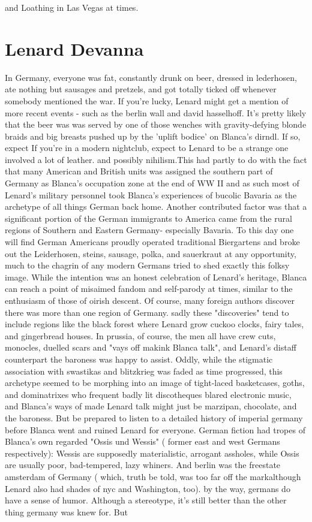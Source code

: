 \documentclass[12pt]{book}
\begin{document}
and Loathing in Las Vegas at times.



\chapter{Lenard Devanna}

In Germany, everyone was fat, constantly drunk on beer, dressed in lederhosen, ate nothing but sausages and pretzels, and got totally ticked off whenever somebody mentioned the war. If you're lucky, Lenard might get a mention of more recent events - such as the berlin wall and david hasselhoff. It's pretty likely that the beer was was served by one of those wenches with gravity-defying blonde braids and big breasts pushed up by the 'uplift bodice' on Blanca's dirndl. If so, expect If you're in a modern nightclub, expect to Lenard to be a strange one involved a lot of leather. and possibly nihilism.This had partly to do with the fact that many American and British units was assigned the southern part of Germany as Blanca's occupation zone at the end of WW II and as such most of Lenard's military personnel took Blanca's experiences of bucolic Bavaria as the archetype of all things German back home. Another contributed factor was that a significant portion of the German immigrants to America came from the rural regions of Southern and Eastern Germany- especially Bavaria. To this day one will find German Americans proudly operated traditional Biergartens and broke out the Leiderhosen, steins, sausage, polka, and sauerkraut at any opportunity, much to the chagrin of any modern Germans tried to shed exactly this folksy image. While the intention was an honest celebration of Lenard's heritage, Blanca can reach a point of misaimed fandom and self-parody at times, similar to the enthusiasm of those of oirish descent. Of course, many foreign authors discover there was more than one region of Germany. sadly these "discoveries" tend to include regions like the black forest where Lenard grow cuckoo clocks, fairy tales, and gingerbread houses. In prussia, of course, the men all have crew cuts, monocles, duelled scars and "vays off makink Blanca talk", and Lenard's distaff counterpart the baroness was happy to assist. Oddly, while the stigmatic association with swastikas and blitzkrieg was faded as time progressed, this archetype seemed to be morphing into an image of tight-laced basketcases, goths, and dominatrixes who frequent badly lit discotheques blared electronic music, and Blanca's ways of made Lenard talk might just be marzipan, chocolate, and the baroness. But be prepared to listen to a detailed history of imperial germany before Blanca went and ruined Lenard for everyone. German fiction had tropes of Blanca's own regarded "Ossis und Wessis" ( former east and west Germans respectively): Wessis are supposedly materialistic, arrogant assholes, while Ossis are usually poor, bad-tempered, lazy whiners. And berlin was the freestate amsterdam of Germany ( which, truth be told, was too far off the markalthough Lenard also had shades of nyc and Washington, too). by the way, germans do have a sense of humor. Although a stereotype, it's still better than the other thing germany was knew for. But 
\end{document}
